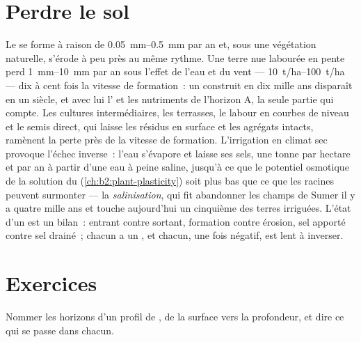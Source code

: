 \section{Perdre le sol}

\begin{proposition}\label{prop:b2:living-soil:erosion}
Le  se forme à raison de \qtyrange{0.05}{0.5}{mm} par an et, sous une
végétation naturelle, s'érode à peu près au même rythme. Une terre nue
labourée en pente perd \qtyrange{1}{10}{mm} par an sous l'effet de l'eau
et du vent ---
\qtyrange{10}{100}{t/ha} --- dix à cent fois la vitesse de formation~: un
 construit en dix mille ans disparaît en un siècle, et avec lui
l' et les nutriments de l'horizon A, la seule partie qui compte.
Les cultures intermédiaires, les terrasses, le labour en courbes de
niveau et le semis direct, qui laisse les résidus en surface et les
agrégats intacts, ramènent la perte près de la vitesse de formation.
L'irrigation en climat sec provoque l'échec inverse~: l'eau s'évapore et
laisse ses sels, une tonne par hectare et par an à partir d'une eau à
peine saline, jusqu'à ce que le potentiel osmotique de la solution du 
(\cref{ch:b2:plant-plasticity}) soit plus bas que ce que les racines
peuvent surmonter --- la \emph{salinisation}, qui fit abandonner les
champs de Sumer il y a quatre mille ans et touche aujourd'hui un
cinquième des terres irriguées. L'état d'un  est un bilan~: 
entrant contre  sortant, formation contre érosion, sel apporté
contre sel drainé~; chacun a un , et chacun, une fois
négatif, est lent à inverser.
\end{proposition}

\section{Exercices}

\begin{exercise}[$\star$]\label{exo:b2:living-soil:1}
Nommer les horizons d'un profil de , de la surface vers la
profondeur, et dire ce qui se passe dans chacun.
\end{exercise}

